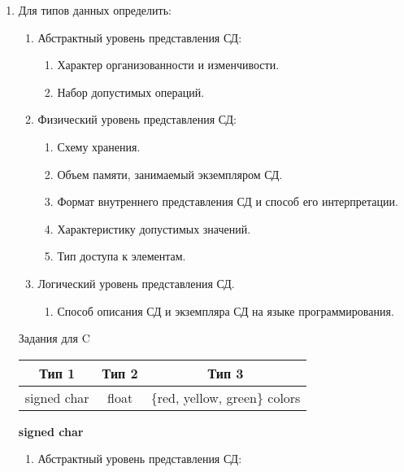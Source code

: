 \documentclass[a4paper,14pt]{extarticle}
\begin{document}
\begin{enumerate}
	\item Для типов данных определить:
	      \begin{enumerate}[label*=\arabic*.]
		      \item Абстрактный уровень представления СД:

		            \begin{enumerate}[label*=\arabic*.]
			            \item Характер организованности и изменчивости.
			            \item Набор допустимых операций.
		            \end{enumerate}

		      \item Физический уровень представления СД:

		            \begin{enumerate}[label*=\arabic*.]
			            \item Схему хранения.
			            \item Объем памяти, занимаемый экземпляром СД.
			            \item Формат внутреннего представления СД и способ его интерпретации.
			            \item Характеристику допустимых значений.
			            \item Тип доступа к элементам.
		            \end{enumerate}

		      \item Логический уровень представления СД.
		            \begin{enumerate}[label*=\arabic*.]
			            \item Способ описания СД и экземпляра СД на языке программирования.
		            \end{enumerate}
	      \end{enumerate}

	      \begin{center}Задания для C\\
		      \begin{tabular}{|c|c|c|}
			      \hline
			      Тип 1       & Тип 2 & Тип 3                       \\
			      \hline
			      signed char & float & \{red, yellow, green\} colors \\
			      \hline
		      \end{tabular}
	      \end{center}
	      \textbf{signed char}
	      \begin{enumerate}[label*=\arabic*.]
		      \item Абстрактный уровень представления СД:


\end{enumerate}
\end{enumerate}
\end{document}
